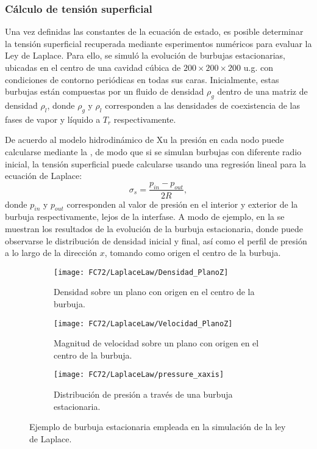 \subsubsection{C\'alculo de tensi\'on superficial}

Una vez definidas las constantes de la ecuaci\'on de estado, es posible determinar la tensi\'on superficial recuperada mediante esperimentos num\'ericos para evaluar la Ley de Laplace. Para ello, se simul\'o la evoluci\'on de burbujas estacionarias, ubicadas en el centro de una cavidad c\'ubica de $200 \times 200 \times 200$ u.g. con condiciones de contorno peri\'odicas en todas sus caras. Inicialmente, estas burbujas est\'an compuestas por un fluido de densidad $\rho_g$ dentro de una matriz de densidad $\rho_l$, donde $\rho_g$ y $\rho_l$ corresponden a las densidades de coexistencia de las fases de vapor y l\'iquido a $T_r$ respectivamente.

De acuerdo al modelo hidrodin\'amico de Xu la presi\'on en cada nodo puede calcularse mediante la , de modo que si se simulan burbujas con diferente radio inicial, la tensi\'on superficial puede calcularse usando una regresi\'on lineal para la ecuaci\'on de Laplace:
\begin{equation}
	\sigma_s = \dfrac{p_{in}-p_{out}}{2 R},
\end{equation}
donde $p_{in}$ y $p_{out}$ corresponden al valor de presi\'on en el interior y exterior de la burbuja respectivamente, lejos de la interfase. A modo de ejemplo, en la  se muestran los resultados de la evoluci\'on de la burbuja estacionaria, donde puede observarse le distribuci\'on de densidad inicial y final, as\'i como el perfil de presi\'on a lo largo de la direcci\'on $x$, tomando como origen el centro de la burbuja.
\begin{figure}[htb]
    \centering
    \begin{subfigure}[t]{0.45\textwidth}
        \centering
        \texttt{[image: FC72/LaplaceLaw/Densidad\_PlanoZ]}
        \caption{Densidad sobre un plano con origen en el centro de la burbuja.}
    \end{subfigure}
    \begin{subfigure}[t]{0.45\textwidth}
        \centering
        \texttt{[image: FC72/LaplaceLaw/Velocidad\_PlanoZ]}
        \caption{Magnitud de velocidad sobre un plano con origen en el centro de la burbuja.}
    \end{subfigure}
    \begin{subfigure}[t]{0.45\textwidth}
        \centering
        \texttt{[image: FC72/LaplaceLaw/pressure\_xaxis]}
        \caption{Distribuci\'on de presi\'on  a trav\'es de una burbuja estacionaria.}
    \end{subfigure}    
    \caption{Ejemplo de burbuja estacionaria empleada en la simulaci\'on de la ley de Laplace.}
    \label{fig:laplace_1_3D}
\end{figure}

